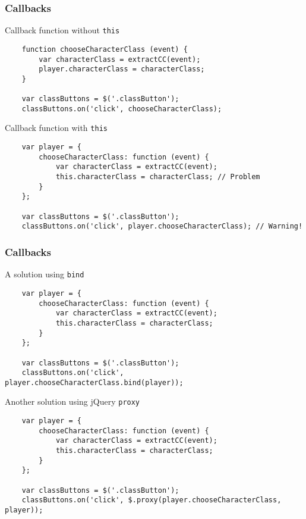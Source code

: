 \begin{frame}[fragile]
  \frametitle{Callbacks}
  \begin{block}{Callback function without \texttt{this}}
    {\tiny
    \begin{verbatim}
    function chooseCharacterClass (event) {
        var characterClass = extractCC(event);
        player.characterClass = characterClass;
    }

    var classButtons = $('.classButton');
    classButtons.on('click', chooseCharacterClass);
    \end{verbatim}
    }
  \end{block}

  \pause

  \begin{block}{Callback function with \texttt{this}}
    {\tiny
    \begin{verbatim}
    var player = {
        chooseCharacterClass: function (event) {
            var characterClass = extractCC(event);
            this.characterClass = characterClass; // Problem
        }
    };

    var classButtons = $('.classButton');
    classButtons.on('click', player.chooseCharacterClass); // Warning!
    \end{verbatim}
    }
  \end{block}
\end{frame}

\begin{frame}[fragile]
  \frametitle{Callbacks}
  \begin{block}{A solution using \texttt{bind}}
    {\tiny
    \begin{verbatim}
    var player = {
        chooseCharacterClass: function (event) {
            var characterClass = extractCC(event);
            this.characterClass = characterClass;
        }
    };

    var classButtons = $('.classButton');
    classButtons.on('click', player.chooseCharacterClass.bind(player));
    \end{verbatim}
    }
  \end{block}

  \pause

  \begin{block}{Another solution using jQuery \texttt{proxy}}
    {\tiny
    \begin{verbatim}
    var player = {
        chooseCharacterClass: function (event) {
            var characterClass = extractCC(event);
            this.characterClass = characterClass;
        }
    };

    var classButtons = $('.classButton');
    classButtons.on('click', $.proxy(player.chooseCharacterClass, player));
    \end{verbatim}
    }
  \end{block}

\end{frame}

